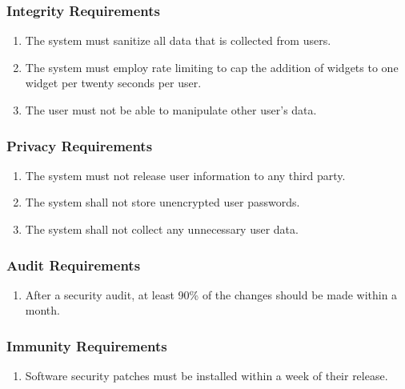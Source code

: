 \documentclass[]{article}
\begin{document}
	\subsubsection{Integrity Requirements}
	\label{ssub:integrity_requirements}
	\begin{enumerate}[{SR}1. ]
		\item The system must sanitize all data that is collected from users.
		\item The system must employ rate limiting to cap the addition of widgets to one widget per twenty seconds per user.
		\item The user must not be able to manipulate other user's data.
	\end{enumerate}
	
	\subsubsection{Privacy Requirements}
	\label{ssub:privacy_requirements}
	\begin{enumerate}[{SR}1. ]
		\item The system must not release user information to any third party.
		\item The system shall not store unencrypted user passwords.
		\item The system shall not collect any unnecessary user data.
	\end{enumerate}
	
	\subsubsection{Audit Requirements}
	\label{ssub:audit_requirements}
	\begin{enumerate}[{SR}1. ]
		\item After a security audit, at least 90\% of the changes should be made within a month.
	\end{enumerate}
	
	\subsubsection{Immunity Requirements}
	\label{ssub:immunity_requirements}
	\begin{enumerate}[{SR}1. ]
		\item Software security patches must be installed within a week of their release.
	\end{enumerate}
	
\end{document}
